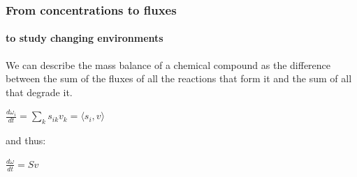 \documentclass{beamer}
\begin{document}
   \begin{frame}
      \frametitle{From concentrations to fluxes}
      \framesubtitle{to study changing environments}

      We can describe the mass balance of a chemical compound as the difference between the sum of the 
      fluxes of all the reactions that form it and the sum of all that degrade it. 

      \bigskip 

      $\frac {d\omega_i}{dt} = \sum \limits_{k} s_{ik} v_k =  \langle  s_{i} , v \rangle  $

      \bigskip

      and thus:

      \bigskip 

      $\frac {d\omega}{dt} = Sv$

   \end{frame}
\end{document}
